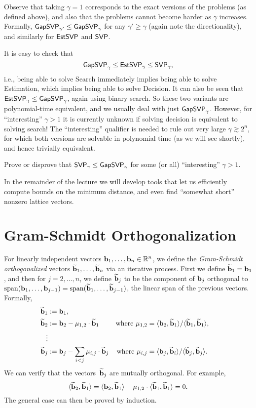 \documentclass[11pt]{article}
\begin{document}
Observe that taking $\gamma=1$ corresponds to the exact versions of
the problems (as defined above), and also that the problems cannot
become harder as $\gamma$ increases. Formally,
$\mathsf{GapSVP}_{\gamma'} \leq \mathsf{GapSVP}_{\gamma}$ for any
$\gamma' \geq \gamma$ (again note the directionality), and similarly
for $\mathsf{EstSVP}$ and $\mathsf{SVP}$.

It is easy to check that
\[ \mathsf{GapSVP}_{\gamma} \leq \mathsf{EstSVP}_{\gamma} \leq \mathsf{SVP}_{\gamma}, \] i.e.,
being able to solve Search immediately implies being able to solve
Estimation, which implies being able to solve Decision. It can also be
seen that $\mathsf{EstSVP}_{\gamma} \leq \mathsf{GapSVP}_{\gamma}$, again using binary
search. So these two variants are polynomial-time equivalent, and we
usually deal with just $\mathsf{GapSVP}_{\gamma}$. However, for
``interesting'' $\gamma > 1$ it is currently unknown if solving
decision is equivalent to solving search! The ``interesting''
qualifier is needed to rule out very large $\gamma \gtrsim 2^{n}$, for
which both versions are solvable in polynomial time (as we will see
shortly), and hence trivially equivalent.

\begin{openproblem}
  \label{open:svp-search-decision}
  Prove or disprove that $\mathsf{SVP}_{\gamma} \leq \mathsf{GapSVP}_{\gamma}$ for
  some (or all) ``interesting'' $\gamma > 1$.
\end{openproblem}

In the remainder of the lecture we will develop tools that let us
efficiently compute bounds on the minimum distance, and even find
``somewhat short'' nonzero lattice vectors.

\section{Gram-Schmidt Orthogonalization}

For linearly independent vectors $\mathbf{b}_1, \ldots, \mathbf{b}_n \in \mathbb{R}^n$,
we define the \emph{Gram-Schmidt orthogonalized} vectors
$\widetilde{\mathbf{b}}_1, \ldots, \widetilde{\mathbf{b}}_n$ via an iterative process. First
we define $\widetilde{\mathbf{b}}_{1} = \mathbf{b}_{1}$, and then for $j=2,\ldots,n$,
we define $\widetilde{\mathbf{b}}_{j}$ to be the component of $\mathbf{b}_{j}$
orthogonal to
$\operatorname{span}(\mathbf{b}_{1}, \ldots, \mathbf{b}_{j-1}) = \operatorname{span}(\widetilde{\mathbf{b}}_{1}, \ldots,
\widetilde{\mathbf{b}}_{j-1})$, the linear span of the previous vectors.
Formally,
\begin{align*}
  \widetilde{\mathbf{b}}_1 &:= \mathbf{b}_1, \\
  \widetilde{\mathbf{b}}_2 &:= \mathbf{b}_2 - \mu_{1,2} \cdot \widetilde{\mathbf{b}}_1
               & \text{where } \mu_{1,2}
               &= \langle\mathbf{b}_2,\widetilde{\mathbf{b}}_1\rangle/\langle\widetilde{\mathbf{b}}_1,\widetilde{\mathbf{b}}_1\rangle, \\
  \vdots \\
  \widetilde{\mathbf{b}}_j &:= \mathbf{b}_j - \sum_{i < j} \mu_{i,j} \cdot \widetilde{\mathbf{b}}_j
               & \text{where } \mu_{i,j}
               &= \langle\mathbf{b}_j,\widetilde{\mathbf{b}}_i\rangle/\langle\widetilde{\mathbf{b}}_j,\widetilde{\mathbf{b}}_j\rangle.
\end{align*}
We can verify that the vectors~$\widetilde{\mathbf{b}}_{j}$ are mutually
orthogonal. For example,
\[ \langle\widetilde{\mathbf{b}}_{2}, \widetilde{\mathbf{b}}_{1}\rangle = \langle\mathbf{b}_{2},
    \widetilde{\mathbf{b}}_{1}\rangle - \mu_{1,2} \cdot \langle\widetilde{\mathbf{b}}_{1},
    \widetilde{\mathbf{b}}_{1}\rangle = 0. \] The general case can then be proved by
induction.
\end{document}
